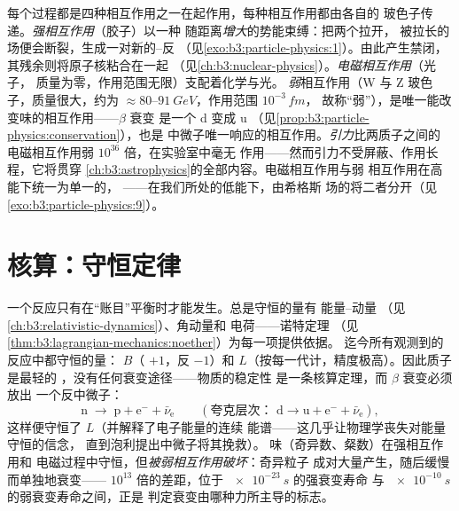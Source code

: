 \begin{remark}[四种相互作用]\label{rem:b3:particle-physics:forces}
每个过程都是四种相互作用之一在起作用，每种相互作用都由各自的
玻色子传递。\emph{强相互作用}（胶子）以一种
随距离\emph{增大}的势能束缚：把两个拉开，
被拉长的场便会断裂，生成一对新的–反
（见\cref{exo:b3:particle-physics:1}）。由此产生禁闭，
其残余则将原子核粘合在一起
（见\cref{ch:b3:nuclear-physics}）。\emph{电磁相互作用}（光子，
质量为零，作用范围无限）支配着化学与光。
\emph{弱}相互作用（W 与 Z 玻色子，质量很大，约为
$\approx80$--$\qty{91}{GeV}$，作用范围 $10^{-3}\,\unit{fm}$，
故称“弱”），是唯一能改变味的相互作用——$\beta$ 衰变
是一个 d 变成 u 
（见\cref{prop:b3:particle-physics:conservation}），也是
中微子唯一响应的相互作用。\emph{引力}比两质子之间的
电磁相互作用弱 $10^{36}$ 倍，在实验室中毫无
作用——然而引力不受屏蔽、作用长程，它将贯穿
\cref{ch:b3:astrophysics}的全部内容。电磁相互作用与弱
相互作用在高能下统一为单一的\emph{}，
——在我们所处的低能下，由希格斯
场的将二者分开（见\cref{exo:b3:particle-physics:9}）。
\end{remark}

\section{核算：守恒定律}

\begin{proposition}[粒子反应的守恒定律]\label{prop:b3:particle-physics:conservation}
一个反应只有在“账目”平衡时才能发生。总是守恒的量有
能量–动量
（见\cref{ch:b3:relativistic-dynamics}）、角动量和
电荷——诺特定理
（见\cref{thm:b3:lagrangian-mechanics:noether}）为每一项提供依据。
迄今所有观测到的反应中都守恒的量：\emph{}
$B$（ $+1$，反 $-1$）和\emph{}
$L$（按每一代计，精度极高）。因此质子是最轻的
，没有任何衰变途径——物质的稳定性
是一条核算定理，而 $\beta$ 衰变必须放出
一个反中微子：
\[
\text{n} \;\to\; \text{p} + \text{e}^- + \bar\nu_{\text{e}}
\qquad (\text{夸克层次： } \text{d} \to \text{u} +
\text{e}^- + \bar\nu_{\text{e}}) ,
\]
这样便守恒了 $L$（并解释了电子能量的连续
能谱——这几乎让物理学丧失对能量守恒的信念，
直到泡利提出中微子将其挽救）。
味（奇异数、粲数）在强相互作用和
电磁过程中守恒，但\emph{被弱相互作用破坏}：奇异粒子
成对大量产生，随后缓慢而单独地衰变——
$10^{13}$ 倍的差距，位于 $\qty{e-23}{s}$ 的强衰变寿命
与 $\qty{e-10}{s}$ 的弱衰变寿命之间，正是
判定衰变由哪种力所主导的标志。
\end{proposition}
\admitted

